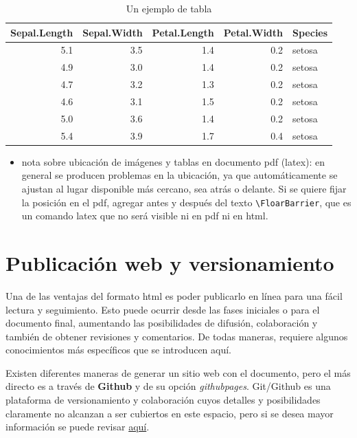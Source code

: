 \documentclass[12pt,twoside]{templates/facsothesis}
\providecommand{\tightlist}{%
  \setlength{\itemsep}{0pt}\setlength{\parskip}{0pt}}
\begin{document}
\begin{table}

\caption{\label{tab:unnamed-chunk-2}Un ejemplo de tabla}
\centering
\begin{tabular}[t]{r|r|r|r|l}
\hline
Sepal.Length & Sepal.Width & Petal.Length & Petal.Width & Species\\
\hline
5.1 & 3.5 & 1.4 & 0.2 & setosa\\
\hline
4.9 & 3.0 & 1.4 & 0.2 & setosa\\
\hline
4.7 & 3.2 & 1.3 & 0.2 & setosa\\
\hline
4.6 & 3.1 & 1.5 & 0.2 & setosa\\
\hline
5.0 & 3.6 & 1.4 & 0.2 & setosa\\
\hline
5.4 & 3.9 & 1.7 & 0.4 & setosa\\
\hline
\end{tabular}
\end{table}

\begin{itemize}
\tightlist
\item
  nota sobre ubicación de imágenes y tablas en documento pdf (latex): en general se producen problemas en la ubicación, ya que automáticamente se ajustan al lugar disponible más cercano, sea atrás o delante. Si se quiere fijar la posición en el pdf, agregar antes y después del texto \texttt{\textbackslash{}FloarBarrier}, que es un comando latex que no será visible ni en pdf ni en html.
\end{itemize}

\hypertarget{publicaciuxf3n-web-y-versionamiento}{%
\section{Publicación web y versionamiento}\label{publicaciuxf3n-web-y-versionamiento}}

Una de las ventajas del formato html es poder publicarlo en línea para una fácil lectura y seguimiento. Esto puede ocurrir desde las fases iniciales o para el documento final, aumentando las posibilidades de difusión, colaboración y también de obtener revisiones y comentarios. De todas maneras, requiere algunos conocimientos más específicos que se introducen aquí.

Existen diferentes maneras de generar un sitio web con el documento, pero el más directo es a través de \textbf{Github} y de su opción \emph{githubpages}. Git/Github es una plataforma de versionamiento y colaboración cuyos detalles y posibilidades claramente no alcanzan a ser cubiertos en este espacio, pero si se desea mayor información se puede revisar \href{https://cienciasocialabierta.netlify.app/class/08-class/}{aquí}.
\end{document}
